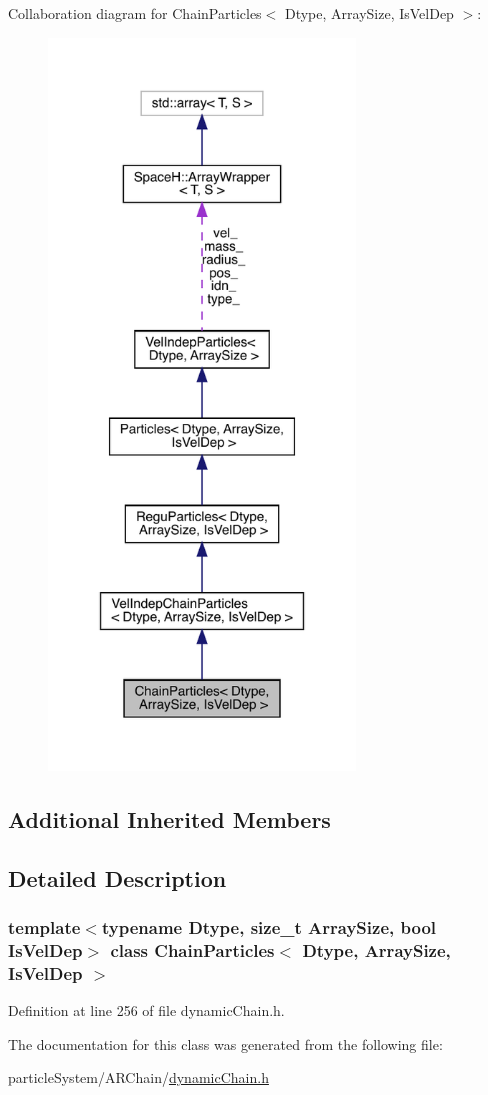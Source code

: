 Collaboration diagram for Chain\+Particles$<$ Dtype, Array\+Size, Is\+Vel\+Dep $>$\+:
\nopagebreak
\begin{figure}[H]
\begin{center}
\leavevmode
\includegraphics[height=550pt]{class_chain_particles__coll__graph}
\end{center}
\end{figure}
\subsection*{Additional Inherited Members}


\subsection{Detailed Description}
\subsubsection*{template$<$typename Dtype, size\+\_\+t Array\+Size, bool Is\+Vel\+Dep$>$\newline
class Chain\+Particles$<$ Dtype, Array\+Size, Is\+Vel\+Dep $>$}



Definition at line 256 of file dynamic\+Chain.\+h.



The documentation for this class was generated from the following file\+:\begin{DoxyCompactItemize}
\item 
particle\+System/\+A\+R\+Chain/\mbox{\hyperlink{dynamic_chain_8h}{dynamic\+Chain.\+h}}\end{DoxyCompactItemize}
